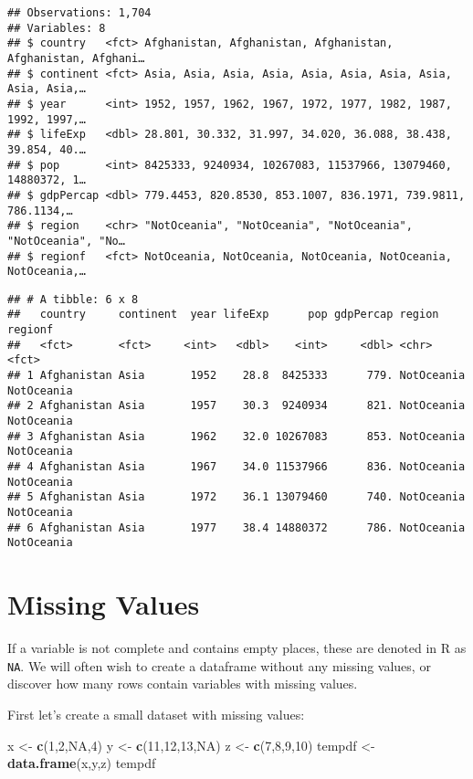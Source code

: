 \documentclass[]{book}
\newenvironment{Shaded}{\begin{snugshade}}{\end{snugshade}}
\newcommand{\KeywordTok}[1]{\textcolor[rgb]{0.13,0.29,0.53}{\textbf{#1}}}
\newcommand{\DecValTok}[1]{\textcolor[rgb]{0.00,0.00,0.81}{#1}}
\newcommand{\StringTok}[1]{\textcolor[rgb]{0.31,0.60,0.02}{#1}}
\newcommand{\OtherTok}[1]{\textcolor[rgb]{0.56,0.35,0.01}{#1}}
\newcommand{\NormalTok}[1]{#1}
\begin{document}
\begin{verbatim}
## Observations: 1,704
## Variables: 8
## $ country   <fct> Afghanistan, Afghanistan, Afghanistan, Afghanistan, Afghani…
## $ continent <fct> Asia, Asia, Asia, Asia, Asia, Asia, Asia, Asia, Asia, Asia,…
## $ year      <int> 1952, 1957, 1962, 1967, 1972, 1977, 1982, 1987, 1992, 1997,…
## $ lifeExp   <dbl> 28.801, 30.332, 31.997, 34.020, 36.088, 38.438, 39.854, 40.…
## $ pop       <int> 8425333, 9240934, 10267083, 11537966, 13079460, 14880372, 1…
## $ gdpPercap <dbl> 779.4453, 820.8530, 853.1007, 836.1971, 739.9811, 786.1134,…
## $ region    <chr> "NotOceania", "NotOceania", "NotOceania", "NotOceania", "No…
## $ regionf   <fct> NotOceania, NotOceania, NotOceania, NotOceania, NotOceania,…
\end{verbatim}

\begin{verbatim}
## # A tibble: 6 x 8
##   country     continent  year lifeExp      pop gdpPercap region     regionf   
##   <fct>       <fct>     <int>   <dbl>    <int>     <dbl> <chr>      <fct>     
## 1 Afghanistan Asia       1952    28.8  8425333      779. NotOceania NotOceania
## 2 Afghanistan Asia       1957    30.3  9240934      821. NotOceania NotOceania
## 3 Afghanistan Asia       1962    32.0 10267083      853. NotOceania NotOceania
## 4 Afghanistan Asia       1967    34.0 11537966      836. NotOceania NotOceania
## 5 Afghanistan Asia       1972    36.1 13079460      740. NotOceania NotOceania
## 6 Afghanistan Asia       1977    38.4 14880372      786. NotOceania NotOceania
\end{verbatim}

\section{Missing Values}\label{missing-values}

If a variable is not complete and contains empty places, these are
denoted in R as \texttt{NA}. We will often wish to create a dataframe
without any missing values, or discover how many rows contain variables
with missing values.

First let's create a small dataset with missing values:

\begin{Shaded}
\begin{Highlighting}[]
\NormalTok{x <-}\StringTok{ }\KeywordTok{c}\NormalTok{(}\DecValTok{1}\NormalTok{,}\DecValTok{2}\NormalTok{,}\OtherTok{NA}\NormalTok{,}\DecValTok{4}\NormalTok{)}
\NormalTok{y <-}\StringTok{ }\KeywordTok{c}\NormalTok{(}\DecValTok{11}\NormalTok{,}\DecValTok{12}\NormalTok{,}\DecValTok{13}\NormalTok{,}\OtherTok{NA}\NormalTok{)}
\NormalTok{z <-}\StringTok{ }\KeywordTok{c}\NormalTok{(}\DecValTok{7}\NormalTok{,}\DecValTok{8}\NormalTok{,}\DecValTok{9}\NormalTok{,}\DecValTok{10}\NormalTok{)}
\NormalTok{tempdf <-}\StringTok{ }\KeywordTok{data.frame}\NormalTok{(x,y,z)}
\NormalTok{tempdf}
\end{Highlighting}
\end{Shaded}
\end{document}
